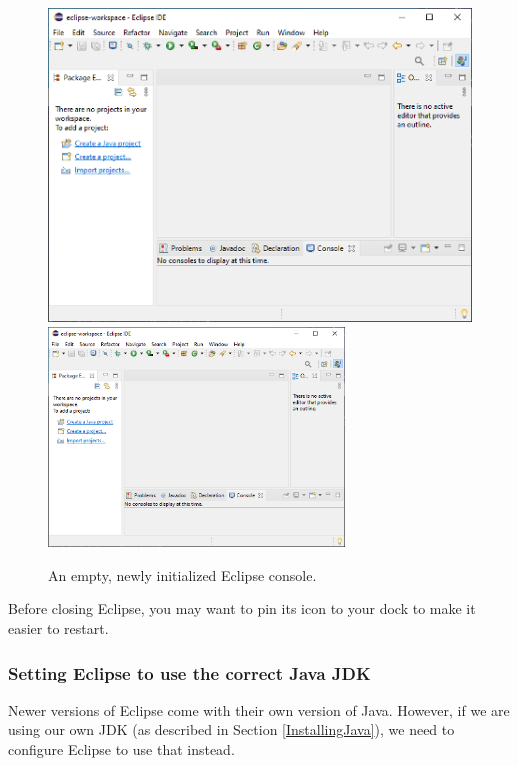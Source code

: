 \begin{figure}[ht]
\begin{center}
\iflatexml
   \includegraphics[]{images/EmptyEclipse}
\else
   \includegraphics[width=0.7\textwidth]{images/EmptyEclipse}
\fi
\end{center}
\caption{An empty, newly initialized Eclipse console.}
\label{EmptyEclipse:fig}
\end{figure}

\ifMacOS
\begin{sideblock}
Before closing Eclipse, you may want to pin its icon to your dock
to make it easier to restart.
\end{sideblock}
\fi

\subsubsection{Setting Eclipse to use the correct Java JDK}
\label{EclipseJDK:sec}

Newer versions of Eclipse come with their own version of Java. However, if we
are using our own JDK (as described in Section \ref{InstallingJava}), we need
to configure Eclipse to use that instead.

